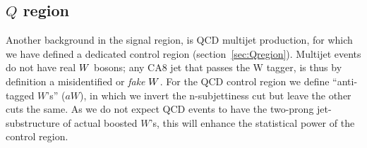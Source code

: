 
\subsection{\texorpdfstring{$Q$}{Q} region}

Another background in the signal region, is QCD multijet production, for which we have defined a
dedicated control region (section~\ref{sec:Qregion}). Multijet events do not have real $W$ bosons;
any CA8 jet that passes the W tagger, is thus by definition a misidentified or \textit{fake} $W$. 
For the QCD control region we define ``anti-tagged $W$'s'' ($aW$), in which we invert the
n-subjettiness cut but leave the other cuts the same. 
As we do not expect QCD events to have the two-prong jet-substructure of actual boosted $W$'s, this
will enhance the statistical power of the control region. 

